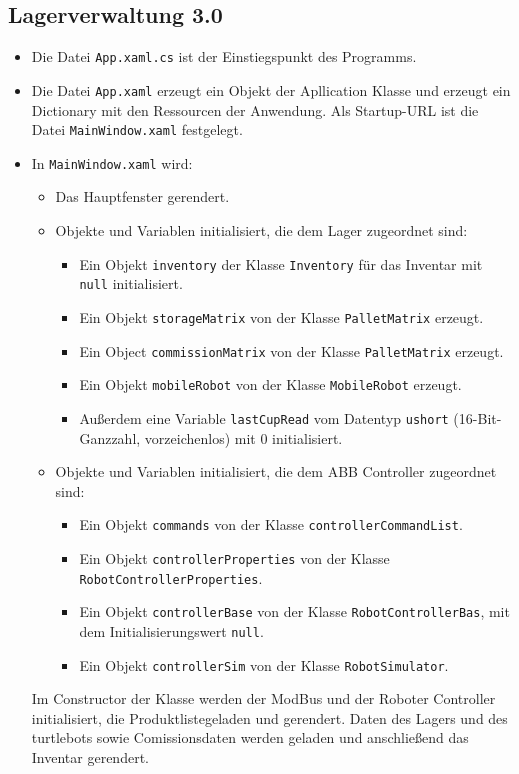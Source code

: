 \documentclass[11pt]{scrartcl}
\begin{document}
    \subsection {Lagerverwaltung 3.0}
    \begin{itemize}
        \item Die Datei \verb|App.xaml.cs| ist der Einstiegspunkt des Programms.
        \item Die Datei \verb|App.xaml| erzeugt ein Objekt der Apllication Klasse und erzeugt ein Dictionary mit den Ressourcen der Anwendung. Als Startup-URL ist die Datei \verb |MainWindow.xaml| festgelegt.
        \item In \verb|MainWindow.xaml| wird:
        \begin{itemize}
            \item Das Hauptfenster gerendert.
            \item Objekte und Variablen initialisiert, die dem Lager zugeordnet sind:
            \begin{itemize}
                \item Ein Objekt \verb|inventory| der Klasse \verb|Inventory| für das Inventar mit \verb|null| initialisiert.
                \item Ein Objekt \verb|storageMatrix| von der Klasse \verb|PalletMatrix| erzeugt.
                \item Ein Object \verb|commissionMatrix| von der Klasse \verb|PalletMatrix| erzeugt.
                \item Ein Objekt \verb|mobileRobot| von der Klasse \verb |MobileRobot| erzeugt.
                \item Außerdem eine Variable \verb|lastCupRead| vom Datentyp \verb|ushort| (16-Bit-Ganzzahl, vorzeichenlos) mit 0 initialisiert.
            \end{itemize}
            \item Objekte und Variablen initialisiert, die dem ABB Controller zugeordnet sind:
            \begin{itemize}
                \item Ein Objekt \verb|commands| von der Klasse \verb|controllerCommandList|.
                \item Ein Objekt \verb|controllerProperties| von der Klasse \verb|RobotControllerProperties|.
                \item Ein Objekt \verb|controllerBase| von der Klasse \verb|RobotControllerBas|, mit dem Initialisierungswert \verb|null|.
                \item Ein Objekt \verb|controllerSim| von der Klasse \verb|RobotSimulator|.
            \end{itemize}
        \end{itemize}
        Im Constructor der Klasse werden der ModBus und der Roboter Controller initialisiert, die Produktlistegeladen und gerendert.
        Daten des Lagers und des turtlebots sowie Comissionsdaten werden geladen und anschließend das Inventar gerendert.
    \end{itemize}
\end{document}
